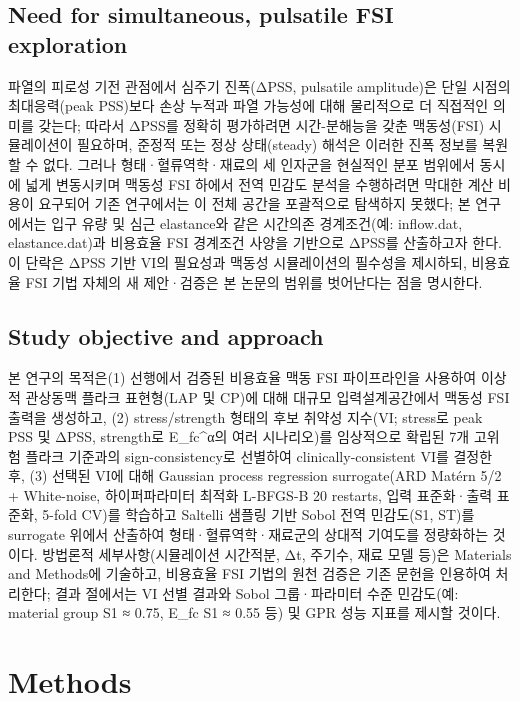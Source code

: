 \documentclass[preprint,12pt]{elsarticle}
\begin{document}
\subsection{Need for simultaneous, pulsatile FSI exploration}
파열의 피로성 기전 관점에서 심주기 진폭(ΔPSS, pulsatile amplitude)은 단일 시점의 최대응력(peak PSS)보다 손상 누적과 파열 가능성에 대해 물리적으로 더 직접적인 의미를 갖는다; 따라서 ΔPSS를 정확히 평가하려면 시간-분해능을 갖춘 맥동성(FSI) 시뮬레이션이 필요하며, 준정적 또는 정상 상태(steady) 해석은 이러한 진폭 정보를 복원할 수 없다. 그러나 형태·혈류역학·재료의 세 인자군을 현실적인 분포 범위에서 동시에 넓게 변동시키며 맥동성 FSI 하에서 전역 민감도 분석을 수행하려면 막대한 계산 비용이 요구되어 기존 연구에서는 이 전체 공간을 포괄적으로 탐색하지 못했다; 본 연구에서는 입구 유량 및 심근 elastance와 같은 시간의존 경계조건(예: inflow.dat, elastance.dat)과 비용효율 FSI 경계조건 사양을 기반으로 ΔPSS를 산출하고자 한다. 이 단락은 ΔPSS 기반 VI의 필요성과 맥동성 시뮬레이션의 필수성을 제시하되, 비용효율 FSI 기법 자체의 새 제안·검증은 본 논문의 범위를 벗어난다는 점을 명시한다.

\subsection{Study objective and approach}
본 연구의 목적은(1) 선행에서 검증된 비용효율 맥동 FSI 파이프라인을 사용하여 이상적 관상동맥 플라크 표현형(LAP 및 CP)에 대해 대규모 입력설계공간에서 맥동성 FSI 출력을 생성하고, (2) stress/strength 형태의 후보 취약성 지수(VI; stress로 peak PSS 및 ΔPSS, strength로 E\_fc\textasciicircum α의 여러 시나리오)를 임상적으로 확립된 7개 고위험 플라크 기준과의 sign-consistency로 선별하여 clinically-consistent VI를 결정한 후, (3) 선택된 VI에 대해 Gaussian process regression surrogate(ARD Matérn 5/2 + White-noise, 하이퍼파라미터 최적화 L-BFGS-B 20 restarts, 입력 표준화·출력 표준화, 5-fold CV)를 학습하고 Saltelli 샘플링 기반 Sobol 전역 민감도(S1, ST)를 surrogate 위에서 산출하여 형태·혈류역학·재료군의 상대적 기여도를 정량화하는 것이다. 방법론적 세부사항(시뮬레이션 시간적분, Δt, 주기수, 재료 모델 등)은 Materials and Methods에 기술하고, 비용효율 FSI 기법의 원천 검증은 기존 문헌을 인용하여 처리한다; 결과 절에서는 VI 선별 결과와 Sobol 그룹·파라미터 수준 민감도(예: material group S1 ≈ 0.75, E\_fc S1 ≈ 0.55 등) 및 GPR 성능 지표를 제시할 것이다.

\section{Methods}
\end{document}
